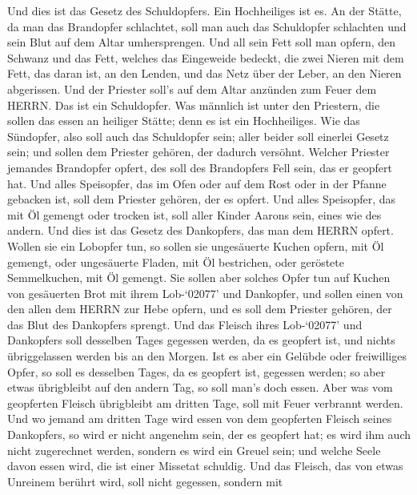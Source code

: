  Und dies ist das Gesetz des Schuldopfers. Ein Hochheiliges
ist es.  An der Stätte, da man das Brandopfer schlachtet,
soll man auch das Schuldopfer schlachten und sein Blut auf dem Altar
umhersprengen.  Und all sein Fett soll man opfern, den
Schwanz und das Fett, welches das Eingeweide bedeckt,  die
zwei Nieren mit dem Fett, das daran ist, an den Lenden, und das Netz
über der Leber, an den Nieren abgerissen.  Und der Priester
soll's auf dem Altar anzünden zum Feuer dem HERRN. Das ist ein
Schuldopfer.  Was männlich ist unter den Priestern, die
sollen das essen an heiliger Stätte; denn es ist ein Hochheiliges.
 Wie das Sündopfer, also soll auch das Schuldopfer sein;
aller beider soll einerlei Gesetz sein; und sollen dem Priester gehören,
der dadurch versöhnt.  Welcher Priester jemandes Brandopfer
opfert, des soll des Brandopfers Fell sein, das er geopfert hat.
 Und alles Speisopfer, das im Ofen oder auf dem Rost oder in
der Pfanne gebacken ist, soll dem Priester gehören, der es opfert.
 Und alles Speisopfer, das mit Öl gemengt oder trocken ist,
soll aller Kinder Aarons sein, eines wie des andern.  Und
dies ist das Gesetz des Dankopfers, das man dem HERRN opfert.
 Wollen sie ein Lobopfer tun, so sollen sie ungesäuerte
Kuchen opfern, mit Öl gemengt, oder ungesäuerte Fladen, mit Öl
bestrichen, oder geröstete Semmelkuchen, mit Öl gemengt. 
Sie sollen aber solches Opfer tun auf Kuchen von gesäuerten Brot mit
ihrem Lob-`02077' und Dankopfer,  und sollen einen von den
allen dem HERRN zur Hebe opfern, und es soll dem Priester gehören, der
das Blut des Dankopfers sprengt.  Und das Fleisch ihres
Lob-`02077' und Dankopfers soll desselben Tages gegessen werden, da es
geopfert ist, und nichts übriggelassen werden bis an den Morgen.
 Ist es aber ein Gelübde oder freiwilliges Opfer, so soll
es desselben Tages, da es geopfert ist, gegessen werden; so aber etwas
übrigbleibt auf den andern Tag, so soll man's doch essen. 
Aber was vom geopferten Fleisch übrigbleibt am dritten Tage, soll mit
Feuer verbrannt werden.  Und wo jemand am dritten Tage wird
essen von dem geopferten Fleisch seines Dankopfers, so wird er nicht
angenehm sein, der es geopfert hat; es wird ihm auch nicht zugerechnet
werden, sondern es wird ein Greuel sein; und welche Seele davon essen
wird, die ist einer Missetat schuldig.  Und das Fleisch,
das von etwas Unreinem berührt wird, soll nicht gegessen, sondern mit

